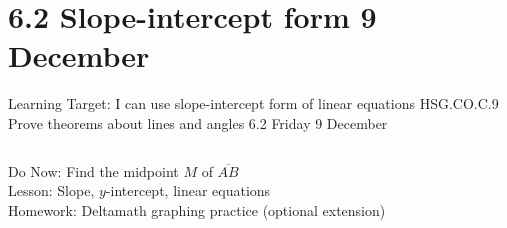 \section{6.2 Slope-intercept form \hfill 9 December \,}
\begin{frame}{Learning Target: I can use slope-intercept form of linear equations}
  {HSG.CO.C.9 Prove theorems about lines and angles  \hfill \alert{6.2 Friday 9 December}}
  \begin{columns}
      Do Now: Find the midpoint $M$ of $\overline{AB}$ \\[1cm]
      Lesson: Slope, $y$-intercept, linear equations \\
      Homework: Deltamath graphing practice (optional extension)
    \begin{flushright}
    \end{flushright}
  \end{columns}
\end{frame}

